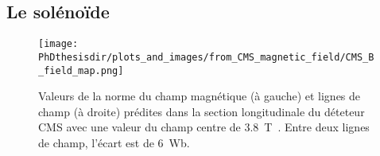 \subsection{Le solénoïde}\label{chapter-LHC-section-CMS-subsec-solenoide}

\begin{figure}[h]
\centering
\texttt{[image: \\PhDthesisdir/plots\_and\_images/from\_CMS\_magnetic\_field/CMS\_B\_field\_map.png]}
\caption[Champ magnétique dans le détecteur CMS.]{Valeurs de la norme du champ magnétique (à gauche) et lignes de champ (à droite) prédites dans la section longitudinale du déteteur CMS avec une valeur du champ centre de \SI{3.8}{\tesla}~\cite{CMS_magnetic_field}. Entre deux lignes de champ, l'écart est de \SI{6}{\weber}.}
\label{fig-chapter-LHC-section-CMS-subsec-solenoide-CMS_B_field_map}
\end{figure}